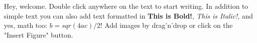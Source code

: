 Hey, welcome. Double click anywhere on the text to start writing. In addition to simple text you can also add text formatted in \textbf{This is Bold!}, \textit{This is Italic!}, and yes, math too: $b = sqr(4ac)/2$! Add images by drag'n'drop or click on the "Insert Figure" button.